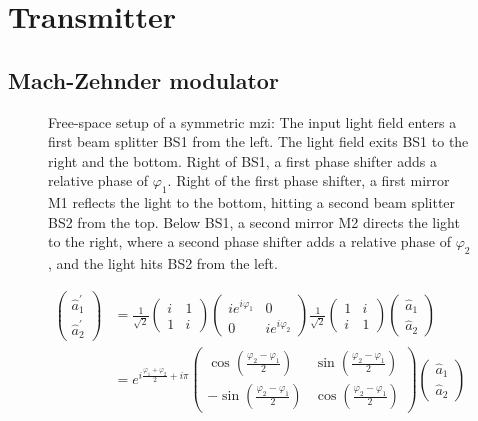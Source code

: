 \section{Transmitter}

\subsection{Mach-Zehnder modulator}

\begin{figure}[htb]
	\centering
	
	\caption{Free-space setup of a symmetric \gls{mzi}: The input light field enters a first beam splitter BS1 from the left. The light field exits BS1 to the right and the bottom. Right of BS1, a first phase shifter adds a relative phase of $\varphi_1$. Right of the first phase shifter, a first mirror M1 reflects the light to the bottom, hitting a second beam splitter BS2 from the top. Below BS1, a second mirror M2 directs the light to the right, where a second phase shifter adds a relative phase of $\varphi_2$, and the light hits BS2 from the left.}
\end{figure}
\begin{equation}
	\begin{split}
		\begin{pmatrix}
			\hat{a}_1^\prime \\
			\hat{a}_2^\prime
		\end{pmatrix}
		&=
		\frac{1}{\sqrt{2}}
		\begin{pmatrix}
			i & 1 \\
			1 & i
		\end{pmatrix}
		\begin{pmatrix}
			ie^{i\varphi_1} & 0 \\
			0 & ie^{i\varphi_2}
		\end{pmatrix}
		\frac{1}{\sqrt{2}}
		\begin{pmatrix}
			1 & i \\
			i & 1
		\end{pmatrix}
		\begin{pmatrix}
			\hat{a}_1 \\
			\hat{a}_2
		\end{pmatrix}
		\\
		&=
		e^{i\frac{\varphi_1+\varphi_2}{2}+i\pi}
		\begin{pmatrix}
			\cos(\frac{\varphi_2-\varphi_1}{2}) & \sin(\frac{\varphi_2-\varphi_1}{2}) \\
			-\sin(\frac{\varphi_2-\varphi_1}{2}) & \cos(\frac{\varphi_2-\varphi_1}{2})
		\end{pmatrix}
		\begin{pmatrix}
			\hat{a}_1 \\
			\hat{a}_2
		\end{pmatrix}
	\end{split}
\end{equation}

